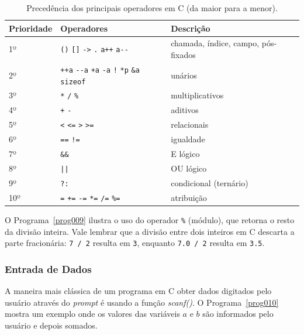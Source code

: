 \documentclass[11pt,fleqn]{book} %
\begin{document}
\begin{table}[htb]
	\centering
	\caption{Precedência dos principais operadores em C (da maior para a menor).}
	\label{tab:prioridade_operadores}
		\begin{tabular}{@{}lll@{}}
			\toprule
			\textbf{Prioridade} & \textbf{Operadores} & \textbf{Descrição} \\ \midrule
			1º & \texttt{()} \texttt{[]} \texttt{->} \texttt{.} \texttt{a++} \texttt{a-{}-} & chamada, índice, campo, pós-fixados \\
			2º & \texttt{++a} \texttt{-{}-a} \texttt{+a} \texttt{-a} \texttt{!} \texttt{*p} \texttt{\&a} \texttt{sizeof} & unários \\
			3º & \texttt{*} \texttt{/} \texttt{\%} & multiplicativos \\
			4º & \texttt{+} \texttt{-} & aditivos \\
			5º & \texttt{<} \texttt{<=} \texttt{>} \texttt{>=} & relacionais \\
			6º & \texttt{==} \texttt{!=} & igualdade \\
			7º & \texttt{\&\&} & E lógico \\
			8º & \texttt{||} & OU lógico \\
			9º & \texttt{?:} & condicional (ternário) \\
			10º & \texttt{=} \texttt{+=} \texttt{-=} \texttt{*=} \texttt{/=} \texttt{\%=} & atribuição \\ \bottomrule
		\end{tabular}%
\end{table}
O Programa~\ref{prog009} ilustra o uso do operador \texttt{\%} (módulo), que retorna o resto da divisão inteira.
Vale lembrar que a divisão entre dois inteiros em C descarta a parte fracionária: \texttt{7 / 2} resulta em \texttt{3}, enquanto \texttt{7.0 / 2} resulta em \texttt{3.5}.


\subsubsection{Entrada de Dados}

A maneira mais clássica de um programa em C obter dados digitados pelo usuário através do \textit{prompt} é usando a função \textit{scanf()}. 
O Programa~\ref{prog010} mostra um exemplo onde os valores das variáveis $a$ e $b$ são informados pelo usuário e depois somados.

\end{document}
